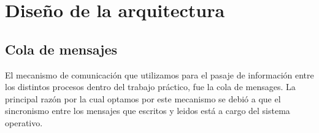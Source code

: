 \section{Diseño de la arquitectura}

\subsection{Cola de mensajes}
 
El mecanismo de comunicación que utilizamos para el pasaje de información entre
los distintos procesos dentro del trabajo práctico, fue la cola de mensages. La 
principal razón por la cual optamos por este mecanismo se debió a que el sincronismo
entre los mensajes que escritos y leidos está a cargo del sistema operativo. 
  